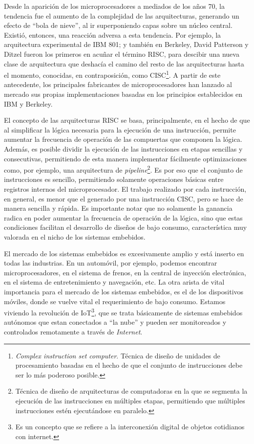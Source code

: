 \documentclass[a4paper]{article}
\begin{document}
Desde la aparición de los microprocesadores a mediados de los años 70, la tendencia fue el aumento de la complejidad de las arquitecturas, generando un efecto de ``bola de nieve'', al ir superponiendo capas sobre un núcleo central. Existió, entonces, una reacción adversa a esta tendencia. Por ejemplo, la arquitectura experimental de IBM 801; y también en Berkeley, David Patterson y Ditzel fueron los primeros en acuñar el término RISC, para descibir una nueva clase de arquitectura que deshacía el camino del resto de las arquitecturas hasta el momento, conocidas, en contraposición, como CISC\footnote{\label{CISC} \emph{Complex instruction set computer}. Técnica de diseño de unidades de procesamiento basadas en el hecho de que el conjunto de instrucciones debe ser lo más poderoso posible.}. A partir de este antecedente, los principales fabricantes de microprocesadores han lanzado al mercado sus propias implementaciones basadas en los principios establecidos en IBM y Berkeley.

El concepto de las arquitecturas RISC se basa, principalmente, en el hecho de que al simplificar la lógica necesaria para la ejecución de una instrucción, permite aumentar la frecuencia de operación de las compuertas que componen la lógica. Además, es posible dividir la ejecución de las instrucciones en etapas sencillas y consecutivas, permitiendo de esta manera implementar fácilmente optimizaciones como, por ejemplo, una arquitectura de \emph{pipeline}\footnote{\label{Pipeline} Técnica de diseño de arquitecturas de computadoras en la que se segmenta la ejecución de las instrucciones en múltiples etapas, permitiendo que múltiples instrucciones estén ejecutándose en paralelo.}. Es por eso que el conjunto de instrucciones es sencillo, permitiendo solamente operaciones básicas entre registros internos del microprocesador. El trabajo realizado por cada instrucción, en general, es menor que el generado por una instrucción CISC, pero se hace de manera sencilla y rápida. Es importante notar que no solamente la ganancia radica en poder aumentar la frecuencia de operación de la lógica, sino que estas condiciones facilitan el desarrollo de diseños de bajo consumo, característica muy valorada en el nicho de los sistemas embebidos.

El mercado de los sistemas embebidos es excesivamente amplio y está inserto en todas las industrias. En un automóvil, por ejemplo, podemos encontrar microprocesadores, en el sistema de frenos, en la central de inyección electrónica, en el sistema de entretenimiento y navegación, etc. La otra arista de vital importancia para el mercado de los sistemas embebidos, es el de los dispositivos móviles, donde se vuelve vital el requerimiento de bajo consumo. Estamos viviendo la revolución de IoT\footnote{\label{Internet of Things} Es un concepto que se refiere a la interconexión digital de objetos cotidianos con internet.}, que se trata básicamente de sistemas embebidos autónomos que estan conectados a ``la nube'' y pueden ser monitoreados y controlados remotamente a través de \emph{Internet}.
\end{document}
